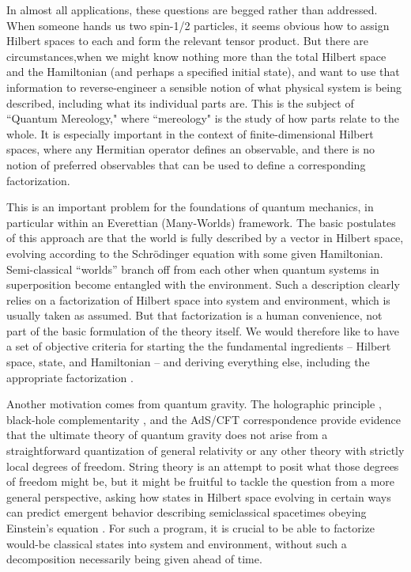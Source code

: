 \documentclass[aps,pra,onecolumn,nofootinbib,11pt,tightenlines]{revtex4-1}
\begin{document}
In almost all applications, these questions are begged rather than addressed.
When someone hands us two spin-1/2 particles, it seems obvious how to assign Hilbert spaces to each and form the relevant tensor product.
But there are circumstances,when we might know nothing more than the total Hilbert space and the Hamiltonian (and perhaps a specified initial state), and want to use that information to reverse-engineer a sensible notion of what physical system is being described, including what its individual parts are.
This is the subject of ``Quantum Mereology," where ``mereology" is the study of how parts relate to the whole.
It is especially important in the context of finite-dimensional Hilbert spaces, where any Hermitian operator defines an observable, and there is no notion of preferred observables that can be used to define a corresponding factorization.

{This is an important problem for the foundations of quantum mechanics, in particular within an Everettian (Many-Worlds) framework.
The basic postulates of this approach are that the world is fully described by a vector in Hilbert space, evolving according to the Schr\"odinger equation with some given Hamiltonian.
Semi-classical ``worlds'' branch off from each other when quantum systems in superposition become entangled with the environment.
Such a description clearly relies on a factorization of Hilbert space into system and environment, which is usually taken as assumed.
But that factorization is a human convenience, not part of the basic formulation of the theory itself.
We would therefore like to have a set of objective criteria for starting the the fundamental ingredients -- Hilbert space, state, and Hamiltonian -- and deriving everything else, including the appropriate factorization \cite{Carroll:2018rhc}.}

{Another motivation comes from quantum gravity.
The holographic principle \cite{Hooft:1993gx,Susskind:1994vu}, black-hole complementarity \cite{Susskind:1993if}, and the AdS/CFT correspondence \cite{Maldacena:1997re} provide evidence that the ultimate theory of quantum gravity does not arise from a straightforward quantization of general relativity or any other theory with strictly local degrees of freedom.
String theory is an attempt to posit what those degrees of freedom might be, but it might be fruitful to tackle the question from a more general perspective, asking how states in Hilbert space evolving in certain ways can predict emergent behavior describing semiclassical spacetimes obeying Einstein's equation \cite{Banks:2011av,Giddings:2015lla,Cao:2016mst,Cao:2017hrv}.
For such a program, it is crucial to be able to factorize would-be classical states into system and environment, without such a decomposition necessarily being given ahead of time.}
\end{document}
